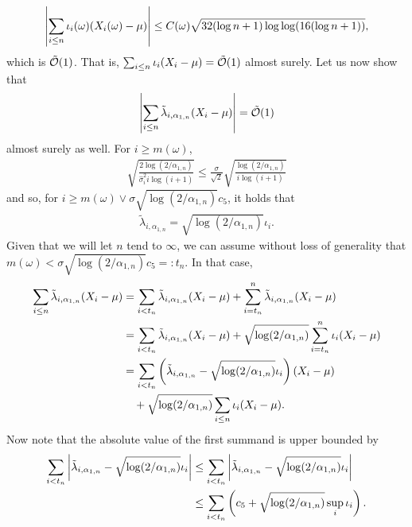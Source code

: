  \begin{align*}
     \left| \sum_{i \leq n} \iota_i(\omega) (X_i(\omega) - \mu) \right| \leq C(\omega) \sqrt{32(\log n + 1)\log\log (16(\log n + 1))},
\end{align*}
which is $\tilde{\mathcal{O}}(1)$. That is, $ \sum_{i \leq n} \iota_i (X_i - \mu) = \tilde{\mathcal{O}}(1)$ almost surely. Let us now show that
\begin{align} \label{eq:numerator_tilde_bigo_1}
     \left| \sum_{i \leq n} \tilde \lambda_{i, \alpha_{1, n}} (X_i - \mu) \right| = \tilde{\mathcal{O}}(1)
\end{align}
almost surely as well. For $i \geq m(\omega)$,
\begin{align*}
    \sqrt{\frac{2 \log (2 / \alpha_{1, n})}{\widehat\sigma_i^2 i \log(i + 1)}} \leq \frac{\sigma}{\sqrt{2}} \sqrt{\frac{\log (2 / \alpha_{1, n})}{i \log(i + 1)}}
\end{align*}
and so, for $i \geq m(\omega) \vee \sigma \sqrt{\log (2 / \alpha_{1, n})}c_5$, it holds that
\begin{align*}
    \tilde \lambda_{i, \alpha_{1, n}} = \sqrt{\log (2 / \alpha_{1, n})}\iota_i.
\end{align*}
Given that we will let $n$ tend to $\infty$, we can assume without loss of generality that $m(\omega) < \sigma \sqrt{\log (2 / \alpha_{1, n})}c_5  =: t_n$. In that case,
\begin{align*}
         \sum_{i \leq n} \tilde \lambda_{i, \alpha_{1, n}} (X_i - \mu) &= \sum_{i < t_n} \tilde \lambda_{i, \alpha_{1, n}} (X_i - \mu) + \sum_{i =t_n}^n \tilde \lambda_{i, \alpha_{1, n}} (X_i - \mu) 
         \\&= \sum_{i < t_n} \tilde \lambda_{i, \alpha_{1, n}} (X_i - \mu) + \sqrt{\log (2 / \alpha_{1, n})} \sum_{i =t_n}^n \iota_i (X_i - \mu) 
         \\&= \sum_{i < t_n} \left( \tilde \lambda_{i, \alpha_{1, n}} - \sqrt{\log (2 / \alpha_{1, n})} \iota_i \right) (X_i - \mu) 
         \\&\quad+ \sqrt{\log (2 / \alpha_{1, n})} \sum_{i \leq n} \iota_i (X_i - \mu). 
\end{align*}
Now note that the absolute value of the first summand is upper bounded by
\begin{align*}
    \sum_{i < t_n} \left| \tilde \lambda_{i, \alpha_{1, n}} - \sqrt{\log (2 / \alpha_{1, n})} \iota_i \right| &\leq \sum_{i < t_n} \left| \tilde \lambda_{i, \alpha_{1, n}} - \sqrt{\log (2 / \alpha_{1, n})} \iota_i \right|  
    \\&\leq  \sum_{i < t_n} \left( c_5 + \sqrt{\log (2 / \alpha_{1, n})} \sup_i \iota_i \right).
\end{align*}

